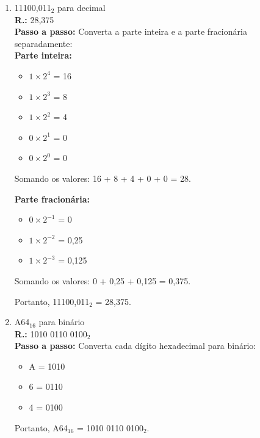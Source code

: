 \documentclass{article}[12pt]
\begin{document}
\begin{enumerate}
\begin{enumerate}
            \item 11100,011$_2$ para decimal \\
            \textbf{R.:} 28,375 \\
            \textbf{Passo a passo:} Converta a parte inteira e a parte fracionária separadamente: \\
                \textbf{Parte inteira:}
                \begin{itemize}
                    \item $1 \times 2^4$ = 16
                    \item $1 \times 2^3$ = \phantom{0}8
                    \item $1 \times 2^2$ = \phantom{0}4
                    \item $0 \times 2^1$ = \phantom{0}0
                    \item $0 \times 2^0$ = \phantom{0}0
                \end{itemize}
                Somando os valores: 16 + 8 + 4 + 0 + 0 = 28.

                \textbf{Parte fracionária:}
                \begin{itemize}
                    \item $0 \times 2^{-1}$ = 0
                    \item $1 \times 2^{-2}$ = 0,25
                    \item $1 \times 2^{-3}$ = 0,125
                \end{itemize}
                Somando os valores: 0 + 0,25 + 0,125 = 0,375.

            Portanto, 11100,011$_2$ = 28,375.

            \item A64$_{16}$ para binário \\
            \textbf{R.:} 1010 0110 0100$_2$ \\
            \textbf{Passo a passo:} Converta cada dígito hexadecimal para binário:
            \begin{itemize}
                \item A = 1010
                \item 6 = 0110
                \item 4 = 0100
            \end{itemize}
            Portanto, A64$_{16}$ = 1010 0110 0100$_2$.


\end{enumerate}
\end{enumerate}
\end{document}
